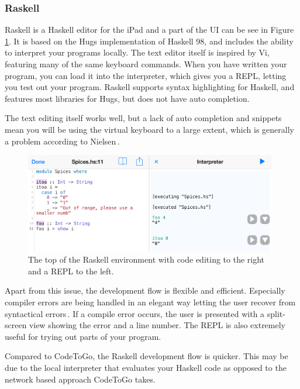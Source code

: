 \subsubsection{Raskell}
\label{subsub:Raskell}
Raskell is a Haskell editor for the iPad and a part of the UI can be see in Figure \ref{fig:Raskell_screenshot}. It is based on the Hugs implementation of Haskell 98, and includes the ability to interpret your programs locally. The text editor itself is inspired by Vi, featuring many of the same keyboard commands. When you have written your program, you can load it into the interpreter, which gives you a REPL, letting you test out your program. Raskell supports syntax highlighting for Haskell, and features most libraries for Hugs, but does not have auto completion.

The text editing itself works well, but a lack of auto completion and snippets mean you will be using the virtual keyboard to a large extent, which is generally a problem according to Nielsen\,\cite[pp. 76]{nielsen2013mobile}. 

\begin{figure}
	\centering
		\includegraphics[width=110mm]{diagrams/Raskell_screenshot.png}
	\caption{The top of the Raskell environment with code editing to the right and a REPL to the
	left.}
\label{fig:Raskell_screenshot}
\end{figure}

Apart from this issue, the development flow is flexible and efficient. Especially compiler errors are being handled in an elegant way letting the user recover from syntactical errors\,\cite{nielsen1990heuristic}. If a compile error occurs, the user is presented with a split-screen view showing the error and a line number. The REPL is also extremely useful for trying out parts of your program.

Compared to CodeToGo, the Raskell development flow is quicker. This may be due to the local interpreter that evaluates your Haskell code as opposed to the network based approach CodeToGo takes. 

